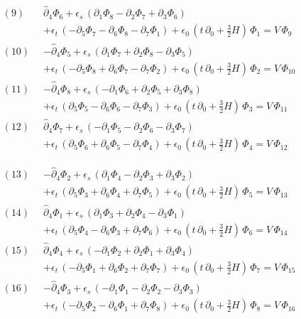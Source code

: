 \documentclass[11pt]{article}
\begin{document}
\[
\begin{aligned}
(9)\;\; & \hat\partial_4\Phi_{6} + \epsilon_s\,(\partial_1\Phi_{8} - \partial_2\Phi_{7} + \partial_3\Phi_{6}) \\
& + \epsilon_t\,(-\partial_5\Phi_{7} - \partial_6\Phi_{8} - \partial_7\Phi_{1}) + \epsilon_0\,(t\,\partial_0 + \tfrac32H)\,\Phi_{1} = V\,\Phi_{9} \\
(10)\;\; & -\hat\partial_4\Phi_{5} + \epsilon_s\,(\partial_1\Phi_{7} + \partial_2\Phi_{8} - \partial_3\Phi_{5}) \\
& + \epsilon_t\,(-\partial_5\Phi_{8} + \partial_6\Phi_{7} - \partial_7\Phi_{2}) + \epsilon_0\,(t\,\partial_0 + \tfrac32H)\,\Phi_{2} = V\,\Phi_{10} \\
(11)\;\; & -\hat\partial_4\Phi_{8} + \epsilon_s\,(-\partial_1\Phi_{6} + \partial_2\Phi_{5} + \partial_3\Phi_{8}) \\
& + \epsilon_t\,(\partial_5\Phi_{5} - \partial_6\Phi_{6} - \partial_7\Phi_{3}) + \epsilon_0\,(t\,\partial_0 + \tfrac32H)\,\Phi_{3} = V\,\Phi_{11} \\
(12)\;\; & \hat\partial_4\Phi_{7} + \epsilon_s\,(-\partial_1\Phi_{5} - \partial_2\Phi_{6} - \partial_3\Phi_{7}) \\
& + \epsilon_t\,(\partial_5\Phi_{6} + \partial_6\Phi_{5} - \partial_7\Phi_{4}) + \epsilon_0\,(t\,\partial_0 + \tfrac32H)\,\Phi_{4} = V\,\Phi_{12}
\end{aligned}
\]

\[
\begin{aligned}
(13)\;\; & -\hat\partial_4\Phi_{2} + \epsilon_s\,(\partial_1\Phi_{4} - \partial_2\Phi_{3} + \partial_3\Phi_{2}) \\
& + \epsilon_t\,(\partial_5\Phi_{3} + \partial_6\Phi_{4} + \partial_7\Phi_{5}) + \epsilon_0\,(t\,\partial_0 + \tfrac32H)\,\Phi_{5} = V\,\Phi_{13} \\
(14)\;\; & \hat\partial_4\Phi_{1} + \epsilon_s\,(\partial_1\Phi_{3} + \partial_2\Phi_{4} - \partial_3\Phi_{1}) \\
& + \epsilon_t\,(\partial_5\Phi_{4} - \partial_6\Phi_{3} + \partial_7\Phi_{6}) + \epsilon_0\,(t\,\partial_0 + \tfrac32H)\,\Phi_{6} = V\,\Phi_{14} \\
(15)\;\; & \hat\partial_4\Phi_{4} + \epsilon_s\,(-\partial_1\Phi_{2} + \partial_2\Phi_{1} + \partial_3\Phi_{4}) \\
& + \epsilon_t\,(-\partial_5\Phi_{1} + \partial_6\Phi_{2} + \partial_7\Phi_{7}) + \epsilon_0\,(t\,\partial_0 + \tfrac32H)\,\Phi_{7} = V\,\Phi_{15} \\
(16)\;\; & -\hat\partial_4\Phi_{3} + \epsilon_s\,(-\partial_1\Phi_{1} - \partial_2\Phi_{2} - \partial_3\Phi_{3}) \\
& + \epsilon_t\,(-\partial_5\Phi_{2} - \partial_6\Phi_{1} + \partial_7\Phi_{8}) + \epsilon_0\,(t\,\partial_0 + \tfrac32H)\,\Phi_{8} = V\,\Phi_{16}
\end{aligned}
\]
\end{document}
